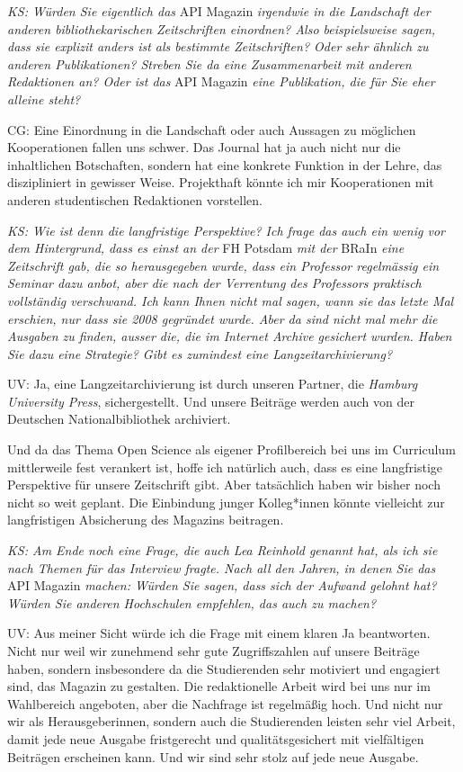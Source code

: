\documentclass[a4paper,
fontsize=11pt,
oneside,
numbers=noperiodatend,
parskip=half-,
bibliography=totoc,
final
]{scrartcl}
\begin{document}
\emph{KS: Würden Sie eigentlich das} API Magazin \emph{irgendwie in die
Landschaft der anderen bibliothekarischen Zeitschriften einordnen? Also
beispielsweise sagen, dass sie explizit anders ist als bestimmte
Zeitschriften? Oder sehr ähnlich zu anderen Publikationen? Streben Sie
da eine Zusammenarbeit mit anderen Redaktionen an? Oder ist das} API
Magazin \emph{eine Publikation, die für Sie eher alleine steht?}

CG: Eine Einordnung in die Landschaft oder auch Aussagen zu möglichen
Kooperationen fallen uns schwer. Das Journal hat ja auch nicht nur die
inhaltlichen Botschaften, sondern hat eine konkrete Funktion in der
Lehre, das diszipliniert in gewisser Weise. Projekthaft könnte ich mir
Kooperationen mit anderen studentischen Redaktionen vorstellen.

\emph{KS: Wie ist denn die langfristige Perspektive? Ich frage das auch
ein wenig vor dem Hintergrund, dass es einst an der} FH Potsdam
\emph{mit der} BRaIn \emph{eine Zeitschrift gab, die so herausgegeben
wurde, dass ein Professor regelmässig ein Seminar dazu anbot, aber die
nach der Verrentung des Professors praktisch vollständig verschwand. Ich
kann Ihnen nicht mal sagen, wann sie das letzte Mal erschien, nur dass
sie 2008 gegründet wurde. Aber da sind nicht mal mehr die Ausgaben zu
finden, ausser die, die im Internet Archive gesichert wurden. Haben Sie
dazu eine Strategie? Gibt es zumindest eine Langzeitarchivierung?}

UV: Ja, eine Langzeitarchivierung ist durch unseren Partner, die
\emph{Hamburg University Press}, sichergestellt. Und unsere Beiträge
werden auch von der Deutschen Nationalbibliothek archiviert.

Und da das Thema Open Science als eigener Profilbereich bei uns im
Curriculum mittlerweile fest verankert ist, hoffe ich natürlich auch,
dass es eine langfristige Perspektive für unsere Zeitschrift gibt. Aber
tatsächlich haben wir bisher noch nicht so weit geplant. Die Einbindung
junger Kolleg*innen könnte vielleicht zur langfristigen Absicherung des
Magazins beitragen.

\emph{KS: Am Ende noch eine Frage, die auch Lea Reinhold genannt hat,
als ich sie nach Themen für das Interview fragte. Nach all den Jahren,
in denen Sie das} API Magazin \emph{machen: Würden Sie sagen, dass sich
der Aufwand gelohnt hat? Würden Sie anderen Hochschulen empfehlen, das
auch zu machen?}

UV: Aus meiner Sicht würde ich die Frage mit einem klaren Ja
beantworten. Nicht nur weil wir zunehmend sehr gute Zugriffszahlen auf
unsere Beiträge haben, sondern insbesondere da die Studierenden sehr
motiviert und engagiert sind, das Magazin zu gestalten. Die
redaktionelle Arbeit wird bei uns nur im Wahlbereich angeboten, aber die
Nachfrage ist regelmäßig hoch. Und nicht nur wir als Herausgeberinnen,
sondern auch die Studierenden leisten sehr viel Arbeit, damit jede neue
Ausgabe fristgerecht und qualitätsgesichert mit vielfältigen Beiträgen
erscheinen kann. Und wir sind sehr stolz auf jede neue Ausgabe.
\end{document}
